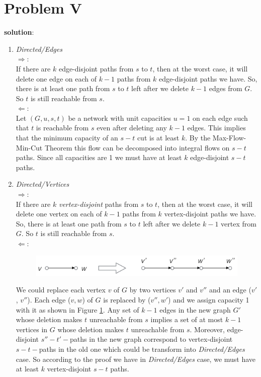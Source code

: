 \section{Problem V}
\textbf{solution}:\\
\begin{enumerate}
	\item \textit{Directed/Edges}\\
	$\Rightarrow$:\\
	If there are $k$ edge-disjoint paths from $s$ to $t$, then at the worst case, it will delete one edge on each of $k - 1$ paths from $k$ edge-disjoint paths we have. So, there is at least one path from $s$ to $t$ left after we delete $k - 1$ edges from $G$. So $t$ is still reachable from $s$. \\

	$\Leftarrow$:\\
	Let $(G, u, s, t)$ be a network with unit capacities $u = 1$ on each edge such that $t$ is reachable from $s$ even after deleting any $k - 1$ edges. This implies that the minimum capacity of an $s-t$ cut is at least $k$. By the Max-Flow-Min-Cut Theorem this flow can be decomposed into integral flows on $s-t$ paths. Since all capacities are 1 we must have at least $k$ edge-disjoint $s-t$ paths. 

	\item \textit{Directed/Vertices}\\
	$\Rightarrow$:\\
	If there are $k$ \textit{vertex-disjoint} paths from $s$ to $t$, then at the worst case, it will delete one vertex on each of $k - 1$ paths from $k$ vertex-disjoint paths we have. So, there is at least one path from $s$ to $t$ left after we delete $k - 1$ vertex from $G$. So $t$ is still reachable from $s$. \\

	$\Leftarrow$:\\
	\begin{figure}[h]
	\centering
	\includegraphics[scale=0.4]{hw4p5b}
	\caption{}
	\label{fig:p5b}
	\end{figure}
	We could replace each vertex $v$ of $G$ by two vertices $v'$ and $v''$ and an edge ($v'$, $v''$). Each edge ($v, w$) of $G$ is replaced by ($v'', w'$) and we assign capacity 1 with it as shown in Figure \ref{fig:p5b}. Any set of $k - 1$ edges in the new graph $G'$ whose deletion makes $t$ unreachable from $s$ implies a set of at most $k - 1$ vertices in $G$ whose deletion makes $t$ unreachable from $s$. Moreover, edge-disjoint $s''-t'-$paths in the new graph correspond to vertex-disjoint $s-t-$paths in the old one which could be transform into \textit{Directed/Edges} case. So according to the proof we have in \textit{Directed/Edges} case, we must have at least $k$ vertex-disjoint $s-t$ paths. 


\end{enumerate}
